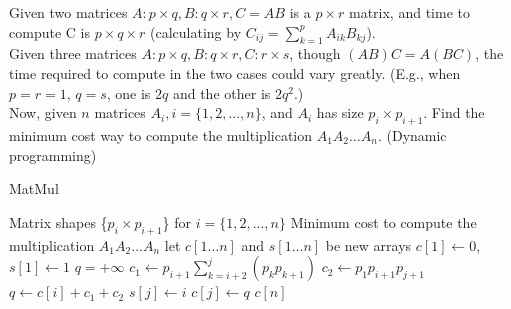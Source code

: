 \noindent {} 
Given two matrices $A : p \times q, B : q\times r, C = AB$ is a $p \times r$ matrix, and time to compute C is $p \times q \times r$ (calculating by $C_{ij} = \sum_{k=1}^p A_{ik} B_{kj}$). \\
Given three matrices $A : p \times q, B : q \times r, C : r \times s$, though $(AB)C = A(BC)$, the time required to compute in the two cases could vary greatly. (E.g., when $p = r = 1$, $q = s$, one is $2q$ and the other is $2 q^2$.) \\
Now, given $n$ matrices $A_i, i = \{1, 2, . . . , n\}$, and $A_i$ has size $p_i \times p_{i+1}$. Find the minimum cost way to compute the multiplication $A_1 A_2 \dots A_n$. (Dynamic programming) \\
\begin{algorithm}[!ht]
\caption{MatMul} \label{alg:matrix}
\begin{algorithmic}[1]
    \Require Matrix shapes \{$p_i \times p_{i+1}$\} for $i = \{1, 2, . . . , n\}$
    \Ensure Minimum cost to compute the multiplication $A_1 A_2 \dots A_n$
    \State let $c[1\dots n]$ and $s[1\dots n]$ be new arrays
    \State $c[1] \leftarrow 0$, $s[1] \leftarrow 1$
        \State $q = +\infty$
         
            \State $c_1 \leftarrow p_{i+1} \sum_{k=i+2}^j (p_k p_{k+1})$
             
            \State $c_2 \leftarrow p_1 p_{i+1} p_{j+1}$
                \State $q \leftarrow c[i] + c_1 + c_2$
                \State $s[j] \leftarrow i$
            \EndIf
        \EndFor
        \State $c[j] \leftarrow q$
    \EndFor
    \State \Return $c[n]$
\end{algorithmic}
\end{algorithm}